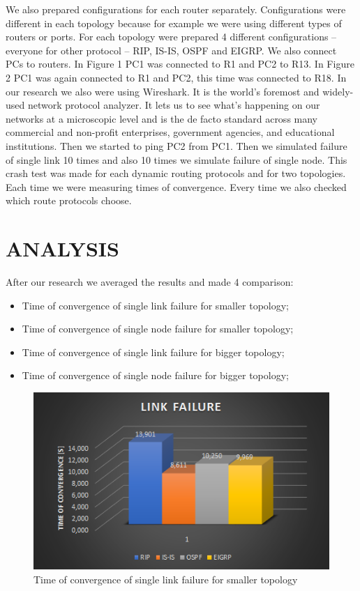 \documentclass[conference,compsoc]{IEEEtran}
\begin{document}
We also prepared configurations for each router separately. Configurations were different in each topology because for example we were using different types of routers or ports. For each topology were prepared 4 different configurations – everyone for other protocol – RIP, IS-IS, OSPF and EIGRP.
We also connect PCs to routers. In Figure 1 PC1 was connected to R1 and PC2 to R13. In Figure 2 PC1 was again connected to R1 and PC2, this time was connected to R18.
In our research we also were using Wireshark. It is the world’s foremost and widely-used network protocol analyzer. It lets us to see what’s happening on our networks at a microscopic level and is the de facto standard across many commercial and non-profit enterprises, government agencies, and educational institutions.
Then we started to ping PC2 from PC1. Then we simulated failure of single link 10 times and also 10 times we simulate failure of single node. This crash test was made for each dynamic routing protocols and for two topologies. Each time we were measuring times of convergence. Every time we also checked which route protocols choose.

\section{ANALYSIS}

After our research we averaged the results and made 4 comparison:
\begin{itemize}
\item Time of convergence of single link failure for smaller topology;
\item Time of convergence of single node failure for smaller topology;
\item Time of convergence of single link failure for bigger topology;
\item Time of convergence of single node failure for bigger topology;

\end{itemize}

\begin{figure}
  \centering
  \includegraphics[width=\textwidth]{images/f3.png}
  \caption{Time of convergence of single link failure for smaller topology}
\end{figure}
\end{document}
